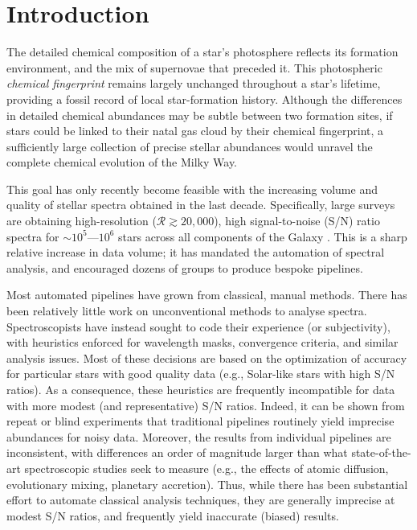 \documentclass[12pt,preprint]{aastex6}
\begin{document}
\section{Introduction}
The detailed chemical composition of a star's photosphere reflects its
 formation environment, and the mix of supernovae that 
preceded it.  This photospheric \emph{chemical fingerprint} remains largely
unchanged throughout a star's lifetime, providing a fossil record of 
local star-formation history.  Although the differences in detailed chemical
abundances may be subtle between two formation sites, if stars could be linked
to their natal gas cloud by their chemical fingerprint, a sufficiently large
collection of precise stellar abundances would unravel the
complete chemical evolution of the Milky Way. 


This goal has only recently become feasible with the increasing volume and 
quality of stellar spectra obtained in the last decade.  Specifically, large 
surveys are obtaining high-resolution ($\mathcal{R} \gtrsim 20,000$), high 
signal-to-noise (S/N) ratio spectra for $\sim10^5$---$10^6$ stars across all 
components of the Galaxy \citep{Gilmore_2012,Zasowski_2013,De_Silva_2015}.  This is a sharp relative increase in data volume; it has mandated the automation of spectral analysis, and encouraged dozens of
groups to produce bespoke pipelines.



Most automated pipelines have grown from classical, manual methods.  There has 
been relatively little work on unconventional methods to analyse spectra.  
Spectroscopists have instead sought to code their experience (or subjectivity), 
with heuristics enforced for wavelength masks, convergence criteria, 
and similar analysis issues.  Most of these decisions are based on the optimization of accuracy for particular stars with good quality data (e.g., Solar-like
stars with high S/N ratios).  As a consequence, these heuristics are frequently 
incompatible for data with more modest (and representative) S/N ratios.  Indeed, 
it can be shown from repeat or blind experiments that traditional pipelines 
routinely yield imprecise abundances for noisy data.  Moreover, the results from individual 
pipelines are inconsistent, with differences an order of 
magnitude larger than what state-of-the-art spectroscopic studies seek to 
measure (e.g., the effects of atomic diffusion, evolutionary mixing, planetary
accretion).  Thus, while there has been substantial effort to automate
classical analysis techniques, they are generally imprecise at modest S/N 
ratios, and frequently yield inaccurate (biased) results.
\end{document}
